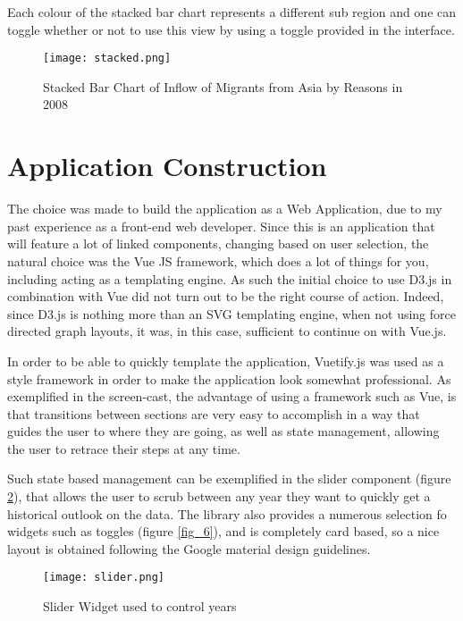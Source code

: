 \documentclass[11pt,a4paper,titlepage]{article}
\begin{document}
Each colour of the stacked bar chart represents a different sub region and one can toggle whether or not to use this view by using a toggle provided in the interface. 

\begin{figure}[ht]
	\caption{Stacked Bar Chart of Inflow of Migrants from Asia by Reasons in 2008}\label{fig_4}
	\centering
	\texttt{[image: stacked.png]}
\end{figure}


\section{Application Construction}
The choice was made to build the application as a Web Application, due to my past experience as a front-end web developer. Since this is an application that will feature a lot of linked components, changing based on user selection, the natural choice was the Vue JS \cite{vue} framework, which does a lot of things for you, including acting as a templating engine. As such the initial choice to use D3.js in combination with Vue did not turn out to be the right course of action. Indeed, since D3.js is nothing more than an SVG templating engine, when not using force directed graph layouts, it was, in this case, sufficient to continue on with Vue.js.

In order to be able to quickly template the application, Vuetify.js \cite{vuetify} was used as a style framework in order to make the application look somewhat professional. As exemplified in the screen-cast, the advantage of using a framework such as Vue, is that transitions between sections are very easy to accomplish in a way that guides the user to where they are going, as well as state management, allowing the user to retrace their steps at any time.

Such state based management can be exemplified in the slider component (figure \ref{fig_5}), that allows the user to scrub between any year they want to quickly get a historical outlook on the data. The library also provides a numerous selection fo widgets such as toggles (figure \ref{fig_6}), and is completely card based, so a nice layout is obtained following the Google material design guidelines.

\begin{figure}[ht]
	\caption{Slider Widget used to control years}\label{fig_5}
	\centering
	\texttt{[image: slider.png]}
\end{figure}
\end{document}
